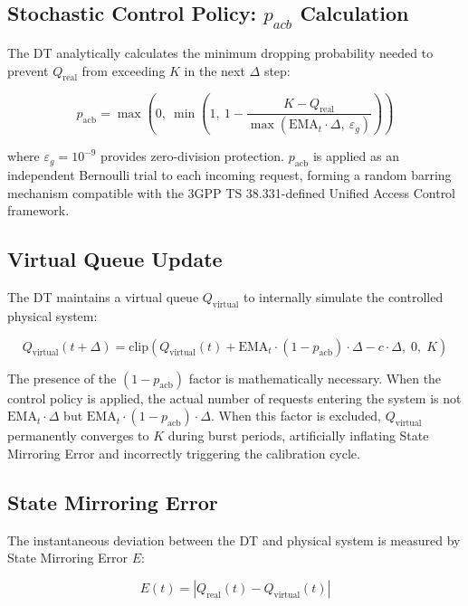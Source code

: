 \documentclass[conference]{IEEEtran}
\newcommand{\qreal}{Q_{\mathrm{real}}}
\newcommand{\qvirt}{Q_{\mathrm{virtual}}}
\newcommand{\pacb}{p_{\mathrm{acb}}}
\newcommand{\ema}{\mathrm{EMA}}
\begin{document}
\subsection{Stochastic Control Policy: $p_{acb}$ Calculation}

The DT analytically calculates the minimum dropping probability needed to prevent $\qreal$ from exceeding $K$ in the next $\Delta$ step:

\begin{equation}
\pacb = \max\!\left(0,\ \min\!\left(1,\ 1 - \frac{K - \qreal}
    {\max(\ema_t \cdot \Delta,\ \varepsilon_g)}\right)\right)
\label{eq:pacb}
\end{equation}

\noindent where $\varepsilon_g = 10^{-9}$ provides zero-division protection. $\pacb$ is applied as an independent Bernoulli trial to each incoming request, forming a random barring mechanism compatible with the 3GPP TS 38.331-defined Unified Access Control framework.

\subsection{Virtual Queue Update}

The DT maintains a virtual queue $\qvirt$ to internally simulate the controlled physical system:

\begin{equation}
\qvirt(t{+}\Delta) = \mathrm{clip}\!\left(
    \qvirt(t) + \ema_t \cdot (1 - \pacb) \cdot \Delta - c \cdot \Delta,\;
    0,\; K\right)
\label{eq:qvirtual}
\end{equation}

The presence of the $(1 - \pacb)$ factor is mathematically necessary. When the control policy is applied, the actual number of requests entering the system is not $\ema_t \cdot \Delta$ but $\ema_t \cdot (1 - \pacb) \cdot \Delta$. When this factor is excluded, $\qvirt$ permanently converges to $K$ during burst periods, artificially inflating State Mirroring Error and incorrectly triggering the calibration cycle.

\subsection{State Mirroring Error}

The instantaneous deviation between the DT and physical system is measured by State Mirroring Error $E$:

\begin{equation}
E(t) = \left| \qreal(t) - \qvirt(t) \right|
\label{eq:error}
\end{equation}
\end{document}

